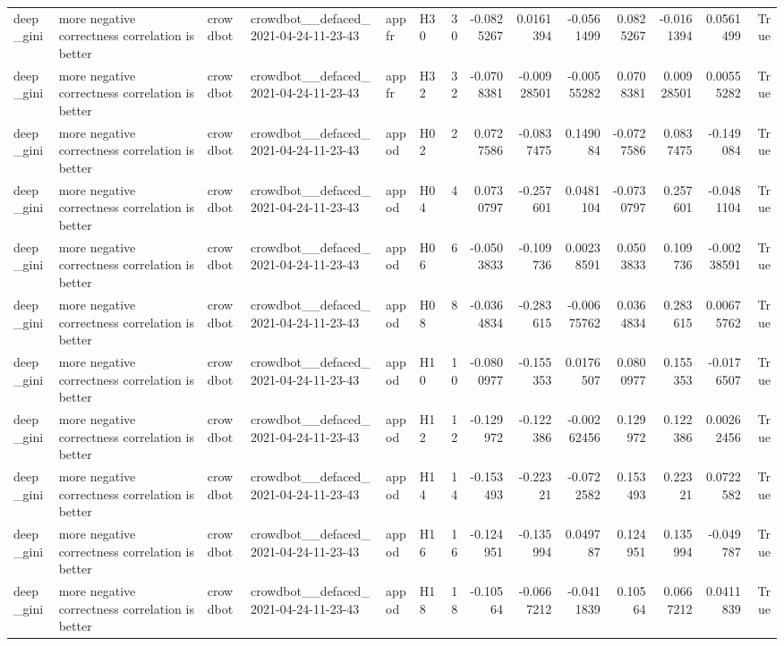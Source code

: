 \begin{longtable}{llllllrrrrrrrr}
deep\_gini & more negative correctness correlation is better & crowdbot & crowdbot\_\_defaced\_2021-04-24-11-23-43 & appfr & H30 & 30 & -0.0825267 & 0.0161394 & -0.0561499 & 0.0825267 & -0.0161394 & 0.0561499 & True \\
deep\_gini & more negative correctness correlation is better & crowdbot & crowdbot\_\_defaced\_2021-04-24-11-23-43 & appfr & H32 & 32 & -0.0708381 & -0.00928501 & -0.00555282 & 0.0708381 & 0.00928501 & 0.00555282 & True \\
deep\_gini & more negative correctness correlation is better & crowdbot & crowdbot\_\_defaced\_2021-04-24-11-23-43 & appod & H02 & 2 & 0.0727586 & -0.0837475 & 0.149084 & -0.0727586 & 0.0837475 & -0.149084 & True \\
deep\_gini & more negative correctness correlation is better & crowdbot & crowdbot\_\_defaced\_2021-04-24-11-23-43 & appod & H04 & 4 & 0.0730797 & -0.257601 & 0.0481104 & -0.0730797 & 0.257601 & -0.0481104 & True \\
deep\_gini & more negative correctness correlation is better & crowdbot & crowdbot\_\_defaced\_2021-04-24-11-23-43 & appod & H06 & 6 & -0.0503833 & -0.109736 & 0.00238591 & 0.0503833 & 0.109736 & -0.00238591 & True \\
deep\_gini & more negative correctness correlation is better & crowdbot & crowdbot\_\_defaced\_2021-04-24-11-23-43 & appod & H08 & 8 & -0.0364834 & -0.283615 & -0.00675762 & 0.0364834 & 0.283615 & 0.00675762 & True \\
deep\_gini & more negative correctness correlation is better & crowdbot & crowdbot\_\_defaced\_2021-04-24-11-23-43 & appod & H10 & 10 & -0.0800977 & -0.155353 & 0.0176507 & 0.0800977 & 0.155353 & -0.0176507 & True \\
deep\_gini & more negative correctness correlation is better & crowdbot & crowdbot\_\_defaced\_2021-04-24-11-23-43 & appod & H12 & 12 & -0.129972 & -0.122386 & -0.00262456 & 0.129972 & 0.122386 & 0.00262456 & True \\
deep\_gini & more negative correctness correlation is better & crowdbot & crowdbot\_\_defaced\_2021-04-24-11-23-43 & appod & H14 & 14 & -0.153493 & -0.22321 & -0.0722582 & 0.153493 & 0.22321 & 0.0722582 & True \\
deep\_gini & more negative correctness correlation is better & crowdbot & crowdbot\_\_defaced\_2021-04-24-11-23-43 & appod & H16 & 16 & -0.124951 & -0.135994 & 0.049787 & 0.124951 & 0.135994 & -0.049787 & True \\
deep\_gini & more negative correctness correlation is better & crowdbot & crowdbot\_\_defaced\_2021-04-24-11-23-43 & appod & H18 & 18 & -0.10564 & -0.0667212 & -0.0411839 & 0.10564 & 0.0667212 & 0.0411839 & True \\

\end{longtable}
